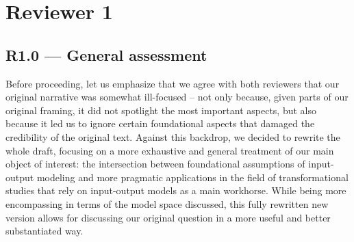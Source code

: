 \section*{Reviewer 1}

\subsection*{R1.0 --- General assessment}

\response Before proceeding, let us emphasize that we agree with both reviewers that our
original narrative was somewhat ill-focused -- not only because, given parts
of our original framing, it did not spotlight the most important aspects, but
also because it led us to ignore certain foundational aspects that damaged the
credibility of the original text. Against this backdrop, we decided to rewrite
the whole draft, focusing on a more exhaustive and general treatment of our
main object of interest: the intersection between foundational assumptions of
input-output modeling and more pragmatic applications in the field of
transformational studies that rely on input-output models as a main workhorse.
While being more encompassing in terms of the model space discussed, this
fully rewritten new version allows for discussing our original question in a
more useful and better substantiated way.

